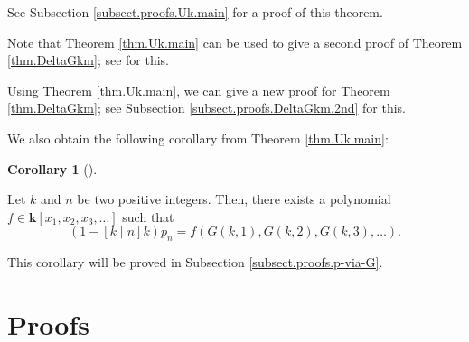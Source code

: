 \documentclass[numbers=enddot,12pt,final,onecolumn,notitlepage]{scrartcl}%
\theoremstyle{definition}
\newtheorem{coro}[theo]{Corollary}
\newenvironment{corollary}[1][]
{\begin{coro}[#1]\begin{leftbar}}
{\end{leftbar}\end{coro}}
\newenvironment{verlong}{}{}
\newenvironment{vershort}{}{}
\begin{document}
See Subsection \ref{subsect.proofs.Uk.main} for a proof of this theorem.

\begin{vershort}
Note that Theorem \ref{thm.Uk.main} can be used to give a second proof of
Theorem \ref{thm.DeltaGkm}; see \cite{verlong} for this.
\end{vershort}

\begin{verlong}
Using Theorem \ref{thm.Uk.main}, we can give a new proof for Theorem
\ref{thm.DeltaGkm}; see Subsection \ref{subsect.proofs.DeltaGkm.2nd} for this.
\end{verlong}

We also obtain the following corollary from Theorem \ref{thm.Uk.main}:

\begin{corollary}
\label{cor.p-via-G}Let $k$ and $n$ be two positive integers. Then, there
exists a polynomial $f\in\mathbf{k}\left[  x_{1},x_{2},x_{3},\ldots\right]  $
such that%
\begin{equation}
\left(  1-\left[  k\mid n\right]  k\right)  p_{n}=f\left(  G\left(
k,1\right)  ,G\left(  k,2\right)  ,G\left(  k,3\right)  ,\ldots\right)  .
\label{eq.cor.p-via-G.eq}%
\end{equation}

\end{corollary}

This corollary will be proved in Subsection \ref{subsect.proofs.p-via-G}.


\section{\label{sect.proofs}Proofs}
\end{document}
